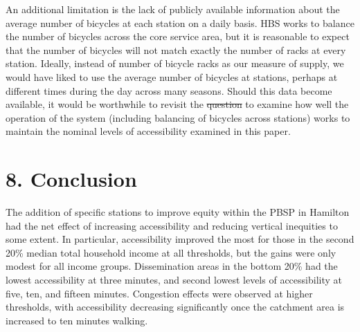 \documentclass[]{elsarticle} %
\providecommand{\DIFaddtex}[1]{{\protect\color{blue}\uwave{#1}}} %
\providecommand{\DIFdeltex}[1]{{\protect\color{red}\sout{#1}}}                      %
\providecommand{\DIFaddbegin}{} %
\providecommand{\DIFaddend}{} %
\providecommand{\DIFdelbegin}{} %
\providecommand{\DIFdelend}{} %
\providecommand{\DIFadd}[1]{\texorpdfstring{\DIFaddtex{#1}}{#1}} %
\providecommand{\DIFdel}[1]{\texorpdfstring{\DIFdeltex{#1}}{}} %
\newcommand{\DIFscaledelfig}{0.5}
\newlength{\DIFdelgraphicswidth} %
\newlength{\DIFdelgraphicsheight} %
\newcommand{\DIFaddincludegraphics}[2][]{{\color{blue}\fbox{\DIFOincludegraphics[#1]{#2}}}} %
\newcommand{\DIFdelincludegraphics}[2][]{%
\sbox{\DIFdelgraphicsbox}{\DIFOincludegraphics[#1]{#2}}%
\settoboxwidth{\DIFdelgraphicswidth}{\DIFdelgraphicsbox} %
\settoboxtotalheight{\DIFdelgraphicsheight}{\DIFdelgraphicsbox} %
\scalebox{\DIFscaledelfig}{%
\parbox[b]{\DIFdelgraphicswidth}{\usebox{\DIFdelgraphicsbox}\\[-\baselineskip] \rule{\DIFdelgraphicswidth}{0em}}\llap{\resizebox{\DIFdelgraphicswidth}{\DIFdelgraphicsheight}{%
\setlength{\unitlength}{\DIFdelgraphicswidth}%
\begin{picture}(1,1)%
\thicklines\linethickness{2pt} %
{\color[rgb]{1,0,0}\put(0,0){\framebox(1,1){}}}%
{\color[rgb]{1,0,0}\put(0,0){\line( 1,1){1}}}%
{\color[rgb]{1,0,0}\put(0,1){\line(1,-1){1}}}%
\end{picture}%
}\hspace*{3pt}}} %
} %
\DeclareRobustCommand{\DIFaddbegin}{\DIFOaddbegin \let\includegraphics\DIFaddincludegraphics} %
\DeclareRobustCommand{\DIFaddend}{\DIFOaddend \let\includegraphics\DIFOincludegraphics} %
\DeclareRobustCommand{\DIFdelbegin}{\DIFOdelbegin \let\includegraphics\DIFdelincludegraphics} %
\DeclareRobustCommand{\DIFdelend}{\DIFOaddend \let\includegraphics\DIFOincludegraphics} %
\begin{document}
An additional limitation is the lack of publicly available information
about the average number of bicycles at each station on a daily basis.
HBS works to balance the number of bicycles across the core service
area, but it is reasonable to expect that the number of bicycles will
not match exactly the number of racks at every station. Ideally, instead
of number of bicycle racks as our measure of supply, we would have liked
to use the average number of bicycles at stations, perhaps at different
times during the day across many seasons. Should this data become
available, it would be worthwhile to revisit the \DIFdelbegin \DIFdel{question }\DIFdelend \DIFaddbegin \DIFadd{study }\DIFaddend to examine how
well the operation of the system (including balancing of bicycles across
stations) works to maintain the nominal levels of accessibility examined
in this paper.

\hypertarget{conclusion}{%
\section{8. Conclusion}\label{conclusion}}

The addition of specific stations to improve equity within the PBSP in
Hamilton had the net effect of increasing accessibility and reducing
vertical inequities to some extent. In particular, accessibility
improved the most for those in the second 20\% median total household
income at all thresholds, but the gains were only modest for all income
groups. Dissemination areas in the bottom 20\% had the lowest
accessibility at three minutes, and second lowest levels of
accessibility at five, ten, and fifteen minutes. Congestion effects were
observed at higher thresholds, with accessibility decreasing
significantly once the catchment area is increased to ten minutes
walking.
\end{document}
